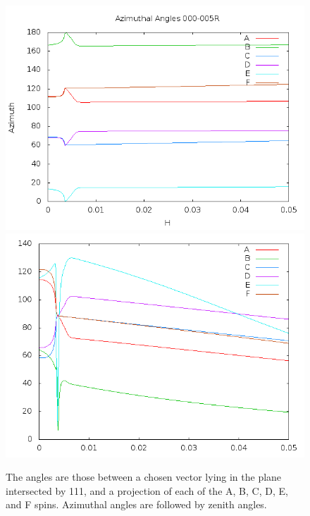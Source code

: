 \documentclass{article}
\begin{document}
\begin{figure}
\centering
\includegraphics[scale=0.5]{azim000to005R.png}
\includegraphics[scale=0.5]{zen000to005R.png}
\caption{The angles are those between a chosen vector lying in the plane intersected by 111,
and a projection of each of the A, B, C, D, E, and F spins. Azimuthal angles are followed by zenith angles.}
\end{figure}
\pagebreak
\end{document}
